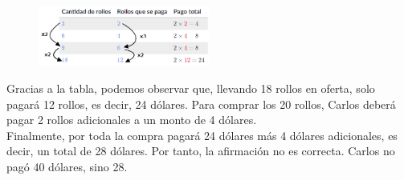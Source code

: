 \begin{figure}[H]
    \centering
    \includegraphics[width=0.5\textwidth]{./Unidad 2/Images/tableS8L101.png}
\end{figure}

Gracias a la tabla, podemos observar que, llevando 18 rollos en oferta, solo pagará 12 rollos, es decir, 24 dólares. Para comprar los 20 rollos, Carlos deberá pagar 2 rollos adicionales a un monto de 4 dólares.\\

Finalmente, por toda la compra pagará 24 dólares más 4 dólares adicionales, es decir, un total de 28 dólares. Por tanto, la afirmación no es correcta. Carlos no pagó 40 dólares, sino 28.
